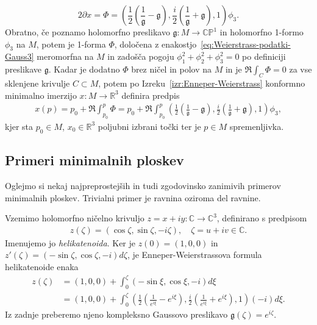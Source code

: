 \documentclass[12pt,a4paper,twoside]{article}
\theoremstyle{definition} %
\theoremstyle{plain} %
\numberwithin{equation}{section}  %
\begin{document}
\begin{equation} \label{eq:Weierstrass-podatki-Gauss3}
2 \partial x = \Phi = \left( \frac{1}{2} \left(\frac{1}{\mathfrak{g}} - \mathfrak{g} \right), \frac{i}{2} \left(\frac{1}{\mathfrak{g}} + \mathfrak{g} \right), 1 \right) \phi_3.
\end{equation}
Obratno, če poznamo holomorfno preslikavo $\mathfrak{g} \colon M \to \mathbb{CP}^{1}$ in holomorfno 1-formo $\phi_3$ na $M$, potem je 1-forma $\Phi$, določena z enakostjo~\eqref{eq:Weierstrass-podatki-Gauss3} meromorfna na $M$ in zadošča pogoju $\phi_{1}^2 + \phi_{2}^2 + \phi_{3}^2 = 0$ po definiciji preslikave $\mathfrak{g}$.
Kadar je dodatno $\Phi$ brez ničel in polov na $M$ in je $\Re \int_{C} \Phi = 0$ za vse sklenjene krivulje $C \subset M$, potem po Izreku~\ref{izr:Enneper-Weierstrass} konformno minimalno imerzijo $x \colon M \to \mathbb{R}^3$ definira predpis
\begin{gather}
x(p) = p_{0} + \Re \int_{p_0}^{p} \Phi = p_{0} + \Re \int_{p_0}^{p} \left( \frac{1}{2} \left(\frac{1}{\mathfrak{g}} - \mathfrak{g} \right), \frac{i}{2} \left(\frac{1}{\mathfrak{g}} + \mathfrak{g} \right), 1 \right) \phi_3,
\end{gather}
kjer sta $p_0 \in M$, $x_0 \in \mathbb{R}^3$ poljubni izbrani točki ter je $p \in M$ spremenljivka.

\subsection{Primeri minimalnih ploskev}
%
Oglejmo si nekaj najpreprostejših in tudi zgodovinsko zanimivih primerov minimalnih ploskev.
Trivialni primer je ravnina oziroma del ravnine.

Vzemimo holomorfno ničelno krivuljo $z = x + iy \colon \mathbb{C} \to \mathbb{C}^3$, definirano s predpisom
\begin{gather} \label{eq:helikatenoida}
z(\zeta) = (\cos \zeta, \sin \zeta, -i\zeta), \quad \zeta = u + iv \in \mathbb{C}.
\end{gather} 
Imenujemo jo \emph{helikatenoida}.
Ker je $z(0) = (1,0,0)$ in $z'(\zeta) = (-\sin \zeta, \cos \zeta, -i) d\zeta$, je Enneper-Weierstrassova formula helikatenoide enaka
\begin{align} \label{eq:EP-helikatenoida}
z(\zeta) &= (1,0,0) + \int_{0}^{\zeta} (-\sin \xi, \cos \xi, -i) d\xi \nonumber \\
	&= (1,0,0) + \int_{0}^{\zeta} \left( \frac{1}{2} \left(\frac{1}{e^{i\xi}} - e^{i\xi} \right), \frac{i}{2} \left(\frac{1}{e^{i\xi}} + e^{i\xi} \right), 1 \right) (-i) d\xi.
\end{align}
Iz zadnje preberemo njeno kompleksno Gaussovo preslikavo $\mathfrak{g}(\zeta) = e^{i\zeta}$.
\end{document}
